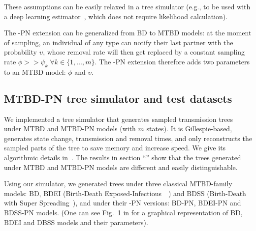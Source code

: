 \documentclass[10pt,letterpaper]{article}
\begin{document}
These assumptions can be easily relaxed in a tree simulator (e.g., to be used with a deep learning estimator~\cite{Voznica2021}, which does not require likelihood calculation).

\smallskip 

The -PN extension can be generalized from BD to MTBD models: at the moment of sampling, an individual of any type can notify their last partner with the probability $\upsilon$, whose removal rate will then get replaced by  a constant sampling rate $\phi >> \psi_k \; \forall k \in \{1, \ldots, m\}$. The -PN extension therefore adds two parameters to an MTBD model: $\phi$ and $\upsilon$.

\subsection*{MTBD-PN tree simulator and test datasets}\label{sec:sim}

We implemented a tree simulator that generates sampled transmission trees under MTBD and MTBD-PN models (with $m$ states). It is Gillespie-based, generates state change, transmission and removal times, and only reconstructs the sampled parts of the tree to save memory and increase speed.
We give its algorithmic details in~. The results in section ``'' show that the trees generated under MTBD and MTBD-PN models are different and easily distinguishable.

Using our simulator, we generated trees under three classical MTBD-family models: BD, BDEI (Birth-Death Exposed-Infectious~~\cite{Stadler2014}) and BDSS (Birth-Death with Super Spreading~\cite{Stadler2013a}), and under their -PN versions: BD-PN, BDEI-PN and BDSS-PN models. (One can see Fig.~1 in \cite{Voznica2021} for a graphical representation of BD, BDEI and DBSS models and their parameters).
\end{document}
